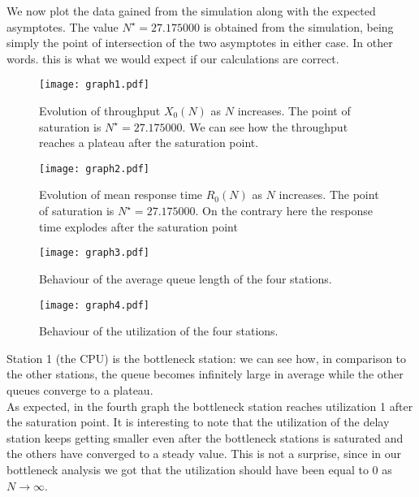 \documentclass[12pt]{article}
\begin{document}
We now plot the data gained from the simulation along with the expected asymptotes. The value $N^{\star}=27.175000$ is obtained from the simulation, being simply the point of intersection of the two asymptotes in either case. In other words. this is what we would expect if our calculations are correct.
\newcommand*{\ShowIntersection}{
	\fill 
	[name intersections={of=GraphCurve and HorizontalLine, name=i, total=\t}] 
	[red, opacity=1, every node/.style={above left, black, opacity=1}] 
	\foreach \s in {1,...,\t}{(i-\s) circle (2pt)
		node [above left] {\s}};
}
\begin{figure}[H]
	\centering
	\texttt{[image: graph1.pdf]}
	\caption{Evolution of throughput $X_0(N)$ as $N$ increases. The point of saturation is $N^{\star}=27.175000$. We can see how the throughput reaches a plateau after the saturation point.}
\end{figure}
\begin{figure}[H]
	\centering
	\texttt{[image: graph2.pdf]}
	\caption{Evolution of mean response time $R_0(N)$ as $N$ increases. The point of saturation is $N^{\star}=27.175000$. On the contrary here the response time explodes after the saturation point}
\end{figure}
\begin{figure}[H]
	\centering
	\texttt{[image: graph3.pdf]}
	\caption{Behaviour of the average queue length of the four stations.}
\end{figure}
\begin{figure}[H]
	\centering
	\texttt{[image: graph4.pdf]}
	\caption{Behaviour of the utilization of the four stations.}
\end{figure}
Station 1 (the CPU) is the bottleneck station: we can see how, in comparison to the other stations, the queue becomes infinitely large in average while the other queues converge to a plateau.\\
As expected, in the fourth graph the bottleneck station reaches utilization 1 after the saturation point. It is interesting to note that the utilization of the delay station keeps getting smaller even after the bottleneck stations is saturated and the others have converged to a steady value. This is not a surprise, since in our bottleneck analysis we got that the utilization should have been equal to 0 as $N\to\infty$.
\end{document}
